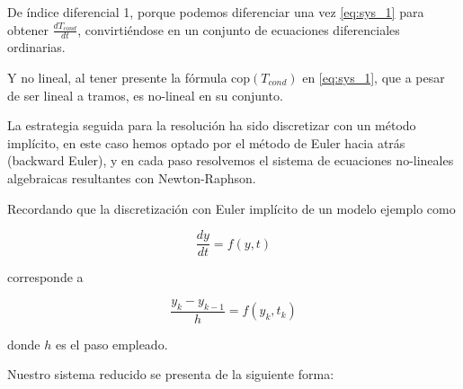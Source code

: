 De índice diferencial 1, porque podemos diferenciar una vez \eqref{eq:sys_1}
para obtener $\frac{dT_{cond}}{dt}$, convirtiéndose en un conjunto de
ecuaciones diferenciales ordinarias.

Y no lineal, al tener presente la fórmula $\text{cop}(T_{cond})$ en
\eqref{eq:sys_1}, que a pesar de ser lineal a tramos, es no-lineal en su
conjunto.

La estrategia seguida para la resolución ha sido discretizar con un método
implícito, en este caso hemos optado por el método de Euler hacia atrás
(backward Euler), y en cada paso resolvemos el sistema de ecuaciones
no-lineales algebraicas resultantes con Newton-Raphson.

Recordando que la discretización con Euler implícito de un modelo ejemplo como

\begin{equation}
	\frac{dy}{dt} = f(y, t)
\end{equation}

corresponde a

\begin{equation}
	\frac{y_k - y_{k-1}}{h} = f(y_k, t_k)
\end{equation}

donde $h$ es el paso empleado.

Nuestro sistema reducido se presenta de la siguiente forma:


